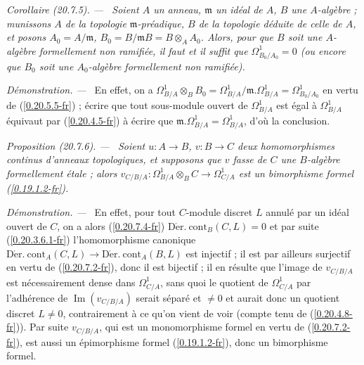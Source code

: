 \documentclass[10pt,oneside]{book}
\makeatletter
\newcommand{\sref}[1]{(\ref{#1})}
\newcommand{\setmanualcurrentlabel}[1]{\def\@currentlabel{#1}}
\newcommand{\oldpage}[2][]{%
  \setcounter{footnote}{0}%
  \marginpar{\scriptsize\textbf{#1}~|~#2}\ignorespaces}
\newenvironment{proposition}[1][]{%
  \setmanualcurrentlabel{#1}\par\medskip\noindent\itshape Proposition (#1). ---\ }{\par}
\newenvironment{corollary}[1][]{%
  \setmanualcurrentlabel{#1}\par\medskip\noindent\itshape Corollaire (#1). ---\ }{\par}
\newenvironment{proof}{%
  \par\medskip\noindent\textit{Démonstration. ---\ }}{\par}
\makeatother
\begin{document}
\begin{corollary}[20.7.5]
\label{0.20.7.5-fr}
Soient $A$ un anneau, $\mathfrak{m}$ un idéal de $A$, $B$ une $A$-algèbre ;
munissons $A$ de la topologie $\mathfrak{m}$-préadique, $B$ de la topologie
déduite de celle de $A$, et posons $A_0=A/\mathfrak{m}$,
$B_0=B/\mathfrak{m}B=B\otimes_A A_0$. Alors, pour que $B$ soit une
$A$-algèbre formellement non ramifiée, il faut et il suffit que
$\Omega^1_{B_0/A_0}=0$ (ou encore que $B_0$ soit une $A_0$-algèbre
formellement non ramifiée).
\end{corollary}

\begin{proof}
En effet, on a
$\Omega^1_{B/A}\otimes_B B_0=\Omega^1_{B/A}/\mathfrak{m}.\Omega^1_{B/A}
=\Omega^1_{B_0/A_0}$ en vertu de \sref{0.20.5.5-fr} ; écrire que tout
sous-module ouvert de $\Omega^1_{B/A}$ est égal à $\Omega^1_{B/A}$ équivaut
par \sref{0.20.4.5-fr} à écrire que
$\mathfrak{m}.\Omega^1_{B/A}=\Omega^1_{B/A}$, d'où la conclusion.
\end{proof}

\begin{proposition}[20.7.6]
\label{0.20.7.6-fr}
Soient $u:A\to B$, $v:B\to C$ deux homomorphismes continus d'anneaux
topologiques, et supposons que $v$ fasse de $C$ une $B$-algèbre formellement
étale ; alors $v_{C/B/A}:\Omega^1_{B/A}\otimes_B C\to\Omega^1_{C/A}$ est un
bimorphisme formel \sref{0.19.1.2-fr}.
\end{proposition}

\begin{proof}
En effet, pour tout $C$-module discret $L$ annulé par un idéal ouvert de $C$,
on a alors \sref{0.20.7.4-fr}
$\operatorname{D\acute{e}r.\ cont}_B(C,L)=0$ et par suite
\sref{0.20.3.6.1-fr} l'homomorphisme canonique
\oldpage[0\textsubscript{IV-1}]{149}
$\operatorname{D\acute{e}r.\ cont}_A(C,L)\to
\operatorname{D\acute{e}r.\ cont}_A(B,L)$ est injectif ; il est par ailleurs
surjectif en vertu de \sref{0.20.7.2-fr}, donc il est bijectif ; il en résulte
que l'image de $v_{C/B/A}$ est nécessairement dense dans $\Omega^1_{C/A}$,
sans quoi le quotient de $\Omega^1_{C/A}$ par l'adhérence de
$\operatorname{Im}(v_{C/B/A})$ serait séparé et $\neq0$ et aurait donc un
quotient discret $L\neq0$, contrairement à ce qu'on vient de voir (compte tenu
de \sref{0.20.4.8-fr}). Par suite $v_{C/B/A}$, qui est un monomorphisme formel
en vertu de \sref{0.20.7.2-fr}, est aussi un épimorphisme formel
\sref{0.19.1.2-fr}, donc un bimorphisme formel.
\end{proof}
\end{document}
